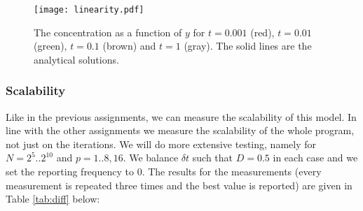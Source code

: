 \documentclass[11pt,a4paper,onecolumn]{article}
\begin{document}
\begin{figure}[H]
  \centering
  \texttt{[image: linearity.pdf]}
  \caption{The concentration as a function of $y$ for $t = 0.001$ (red), $t = 0.01$ (green), $t = 0.1$ (brown) and $t = 1$ (gray). The solid lines are the analytical solutions.}
  \label{fig:lin}
\end{figure}

\subsubsection{Scalability}

Like in the previous assignments, we can measure the scalability of this model. In line with the other assignments we measure the scalability of the whole program, not just on the iterations. We will do more extensive testing, namely for $N = 2^5 .. 2^{10}$ and $p = 1 .. 8, 16$. We balance $\delta t$ such that $D = 0.5$ in each case and we set the reporting frequency to 0. The results for the measurements (every measurement is repeated three times and the best value is reported) are given in Table \ref{tab:diff} below:
\end{document}
